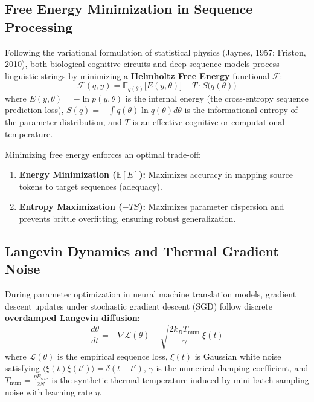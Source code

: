 \documentclass[11pt,letterpaper]{article}
\begin{document}
\subsection{Free Energy Minimization in Sequence Processing}
Following the variational formulation of statistical physics (Jaynes, 1957; Friston, 2010), both biological cognitive circuits and deep sequence models process linguistic strings by minimizing a \textbf{Helmholtz Free Energy} functional $\mathcal{F}$:
\begin{equation}
\mathcal{F}(q, y) = \mathbb{E}_{q(\theta)}\big[ E(y, \theta) \big] - T \cdot S\big(q(\theta)\big)
\end{equation}
where $E(y, \theta) = -\ln p(y, \theta)$ is the internal energy (the cross-entropy sequence prediction loss), $S(q) = -\int q(\theta) \ln q(\theta) d\theta$ is the informational entropy of the parameter distribution, and $T$ is an effective cognitive or computational temperature.

Minimizing free energy enforces an optimal trade-off:
\begin{enumerate}[noitemsep,topsep=1.5pt]
    \item \textbf{Energy Minimization ($\mathbb{E}[E]$):} Maximizes accuracy in mapping source tokens to target sequences (adequacy).
    \item \textbf{Entropy Maximization ($-TS$):} Maximizes parameter dispersion and prevents brittle overfitting, ensuring robust generalization.
\end{enumerate}

\subsection{Langevin Dynamics and Thermal Gradient Noise}
During parameter optimization in neural machine translation models, gradient descent updates under stochastic gradient descent (SGD) follow discrete \textbf{overdamped Langevin diffusion}:
\begin{equation}
\frac{d\theta}{dt} = -\nabla \mathcal{L}(\theta) + \sqrt{\frac{2 k_B T_{\text{num}}}{\gamma}} \, \xi(t)
\end{equation}
where $\mathcal{L}(\theta)$ is the empirical sequence loss, $\xi(t)$ is Gaussian white noise satisfying $\langle \xi(t) \xi(t') \rangle = \delta(t - t')$, $\gamma$ is the numerical damping coefficient, and $T_{\text{num}} = \frac{\eta B_{\text{size}}}{2N}$ is the synthetic thermal temperature induced by mini-batch sampling noise with learning rate $\eta$.
\end{document}
